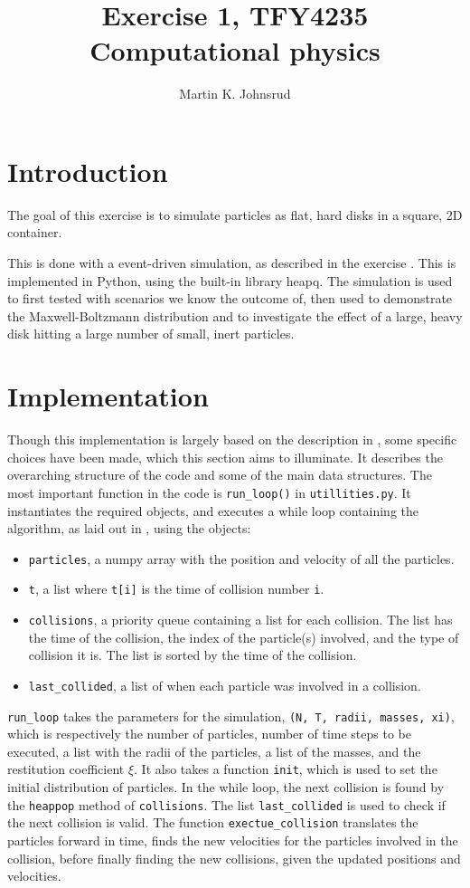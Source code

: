 \documentclass{article}
\title{Exercise 1, TFY4235 Computational physics}
\author{Martin K. Johnsrud}
\date{}
\begin{document}
    \maketitle
    \section*{Introduction}
    The goal of this exercise is to simulate particles as flat, hard disks in a square, 2D container.

    This is done with a event-driven simulation, as described in the exercise \cite{exercise}.
    This is implemented in Python, using the built-in library heapq.
    The simulation is used to first tested with scenarios we know the outcome of, then used to demonstrate the Maxwell-Boltzmann distribution and to investigate the effect of a large, heavy disk hitting a large number of small, inert particles.

    \section*{Implementation}
    Though this implementation is largely based on the description in \cite{exercise}, some specific choices have been made, which this section aims to illuminate.
    It describes the overarching structure of the code and some of the main data structures.
    The most important function in the code is \verb|run_loop()| in \verb|utillities.py|.
    It instantiates the required objects, and executes a while loop containing the algorithm, as laid out in \cite{exercise}, using the objects:
    \begin{itemize}
        \item \verb|particles|, a numpy array with the position and velocity of all the particles.
        \item \verb|t|, a list where \verb|t[i]| is the time of collision number \verb|i|.
        \item \verb|collisions|, a priority queue containing a list for each collision.
        The list has the time of the collision, the index of the particle(s) involved, and the type of collision it is.
        The list is sorted by the time of the collision.
        \item \verb|last_collided|, a list of when each particle was involved in a collision.
    \end{itemize}
    \verb|run_loop| takes the parameters for the simulation, \verb|(N, T, radii, masses, xi)|, which is respectively the number of particles, number of time steps to be executed, a list with the radii of the particles, a list of the masses, and the restitution coefficient $\xi$.
    It also takes a function \verb|init|, which is used to set the initial distribution of particles.
    In the while loop, the next collision is found by the \verb|heappop| method of \verb|collisions|.
    The list \verb|last_collided| is used to check if the next collision is valid.
    The function \verb|exectue_collision| translates the particles forward in time, finds the new velocities for the particles involved in the collision, before finally finding the new collisions, given the updated positions and velocities.
    
\end{document}
